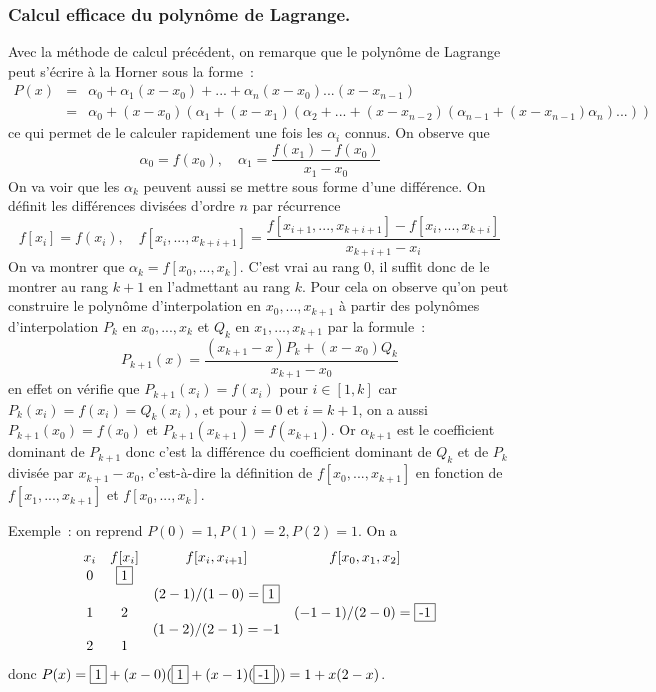 \documentclass[a4paper,11pt]{article}
\begin{document}
\begin{giacjshere}
\subsubsection{Calcul efficace du polyn\^ome de
  Lagrange.}
Avec la m\'ethode de calcul pr\'ec\'edent, on remarque que le
polyn\^ome de Lagrange peut s'\'ecrire \`a la Horner sous la forme~:
\begin{eqnarray*}
 P(x) &=& \alpha_0 + \alpha_1 (x-x_0) + ... + \alpha_n
 (x-x_0)...(x-x_{n-1}) \\
&=& \alpha_0 + (x-x_0)( \alpha_1 + (x-x_1)(\alpha_2 +  ... +
(x-x_{n-2})(\alpha_{n-1}+(x-x_{n-1}) \alpha_n)...))
\end{eqnarray*}
ce qui permet de le calculer rapidement une fois les $\alpha_i$
connus.
On observe que 
\[ \alpha_0=f(x_0), \quad \alpha_1=\frac{f(x_1)-f(x_0)}{x_1-x_0} \]
On va voir que les $\alpha_k$ peuvent aussi se mettre sous forme
d'une diff\'erence.
On d\'efinit les diff\'erences divis\'ees d'ordre $n$ par r\'ecurrence
\[ f[x_i]=f(x_i), \quad f[x_i,...,x_{k+i+1}]=
\frac{f[x_{i+1},...,x_{k+i+1}]-f[x_i,...,x_{k+i}]}{x_{k+i+1}-x_i} \]
On va montrer que $\alpha_k=f[x_0,...,x_k]$.
C'est vrai au rang 0, il suffit donc de le montrer au rang $k+1$ en
l'admettant au rang $k$. Pour cela on observe qu'on peut construire 
le polyn\^ome d'interpolation en $x_0,...,x_{k+1}$ \`a partir des polyn\^omes 
d'interpolation $P_k$ en $x_0,...,x_k$ et $Q_k$ en $x_1,...,x_{k+1}$ 
par la formule~:
\[ P_{k+1}(x)= \frac{(x_{k+1}-x)P_k + (x-x_0)Q_k}{x_{k+1}-x_0}\]
en effet on v\'erifie que $P_{k+1}(x_i)=f(x_i)$ pour $i\in [1,k]$ car
$P_k(x_i)=f(x_i)=Q_k(x_i)$,
et pour $i=0$ et $i=k+1$, on a aussi $P_{k+1}(x_0)=f(x_0)$ et  
$P_{k+1}(x_{k+1})=f(x_{k+1})$.
Or $\alpha_{k+1}$ est le coefficient dominant de $P_{k+1}$ donc
c'est la diff\'erence du coefficient dominant de $Q_k$ et de $P_k$
divis\'ee par $x_{k+1}-x_0$, c'est-\`a-dire la d\'efinition de 
$f[x_0,...,x_{k+1}]$ en fonction de $f[x_1,...,x_{k+1}]$ et $f[x_0,...,x_{k}]$.

Exemple~: on reprend $P(0)=1, P(1)=2, P(2)=1$. On a
\[
\begin{array}{cccc}
x_i & f[x_i] & f[x_i,x_{i+1}] & f[x_0,x_1,x_2] \\
0 & \framebox{1} & & \\
  &   & (2-1)/(1-0)=\framebox{1} & \\
1 & 2 & &  (-1-1)/(2-0)=\framebox{-1}   \\
  &   & (1-2)/(2-1)=-1 & \\
2 & 1 & & \\
\end{array}
\]
donc $P(x)=\framebox{1}+(x-0)(\framebox{1}+(x-1)(\framebox{-1}))=1+x(2-x)$.


\end{giacjshere}
\end{document}
